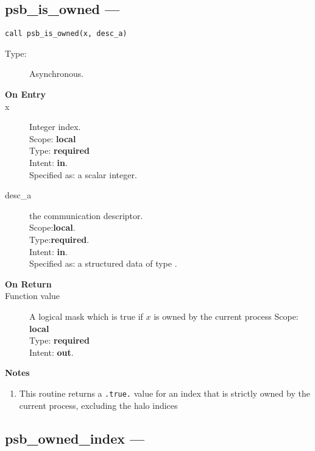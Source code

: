 %
%
\clearpage\subsection*{psb\_is\_owned  --- }

\begin{verbatim}
call psb_is_owned(x, desc_a)
\end{verbatim}

\begin{description}
\item[Type:] Asynchronous.
\item[\bf On Entry]
\item[x] Integer index.\\
Scope: {\bf local} \\
Type: {\bf required}\\
Intent: {\bf in}.\\
Specified as: a scalar integer.\\
\item[desc\_a] the communication descriptor.\\
Scope:{\bf local}.\\
Type:{\bf required}.\\
Intent: {\bf in}.\\
Specified as: a structured data of type \descdata.
\end{description}

\begin{description}
\item[\bf On Return]
\item[Function value] A logical mask which is true if 
  $x$ is  owned by the current process
Scope: {\bf local} \\
Type: {\bf required}\\
Intent: {\bf out}.\\
\end{description}


{\par\noindent\large\bfseries Notes}
\begin{enumerate}
\item This routine returns a \verb|.true.| value for an index
  that is strictly owned by the current process, excluding the halo
  indices
\end{enumerate}


\clearpage\subsection*{psb\_owned\_index  --- }

